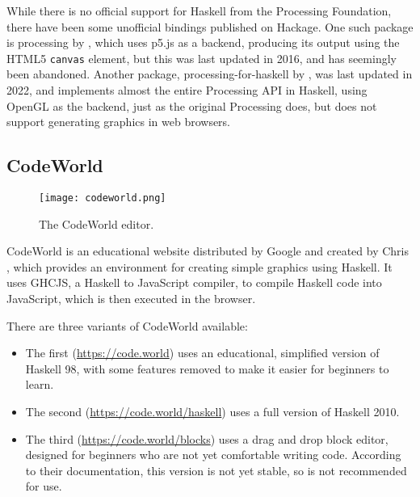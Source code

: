 \documentclass[../main.tex]{subfiles}
\begin{document}
            While there is no official support for Haskell from the Processing Foundation,
                there have been some unofficial bindings published on Hackage.
            One such package is processing by \citet{hackageProcessing}, which uses p5.js
                as a backend, producing its output using the HTML5 \texttt{canvas} element, but
                this was last updated in 2016, and has seemingly been abandoned.
            Another package, processing-for-haskell by \citet{hackageProcessingForHaskell},
                was last updated in 2022, and implements almost the entire Processing API in
                Haskell, using OpenGL as the backend, just as the original Processing does, but
                does not support generating graphics in web browsers.

        \subsection{CodeWorld}
            \begin{figure}[H]
                \centering
                \texttt{[image: codeworld.png]}
                    \caption{The CodeWorld editor.}
                    \label{fig:codeworld}
            \end{figure}

            CodeWorld is an educational website distributed by Google and created by Chris
                \citet{codeWorldGitHub}, which provides an environment for creating simple
                graphics using Haskell.
            It uses GHCJS, a Haskell to JavaScript compiler, to compile Haskell code into
                JavaScript, which is then executed in the browser.

            There are three variants of CodeWorld available:
            \begin{itemize}
                \item The first (\url{https://code.world}) uses an educational, simplified
                      version of Haskell 98, with some features removed to make it easier for
                      beginners to learn.
                \item The second (\url{https://code.world/haskell}) uses a full version of
                      Haskell 2010.
                \item The third (\url{https://code.world/blocks}) uses a drag and drop block
                      editor, designed for beginners who are not yet comfortable writing code.
                      According to their documentation, this version is not yet stable, so is not
                          recommended for use.
            \end{itemize}
\end{document}

